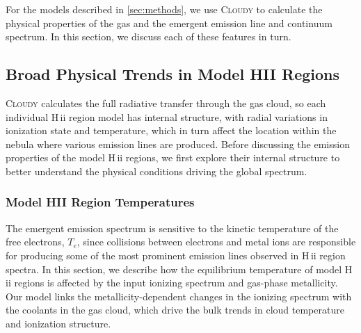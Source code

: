 \documentclass[twocolumn, tighten]{aastex61}
\newcommand{\Sec}[1]{\autoref{sec:#1}}
\newcommand{\Cloudy}{\textsc{Cloudy}\xspace}
\newcommand{\Te}{\ensuremath{T_{e}}}
\newcommand{\hii}{H\,{\sc ii}\xspace}
\begin{document}
For the models described in \Sec{methods}, we use \Cloudy to calculate the physical properties of the gas and the emergent emission line and continuum spectrum. In this section, we discuss each of these features in turn.

\subsection{Broad Physical Trends in Model HII Regions}\label{sec:models:broad}

\Cloudy calculates the full radiative transfer through the gas cloud, so each individual \hii region model has internal structure, with radial variations in ionization state and temperature, which in turn affect the location within the nebula where various emission lines are produced. Before discussing the emission properties of the model \hii regions, we first explore their internal structure to better understand the physical conditions driving the global spectrum.

\subsubsection{Model HII Region Temperatures}\label{sec:models:broad:temp}

The emergent emission spectrum is sensitive to the kinetic temperature of the free electrons, \Te{}, since collisions between electrons and metal ions are responsible for producing some of the most prominent emission lines observed in \hii region spectra. In this section, we describe how the equilibrium temperature of model \hii regions is affected by the input ionizing spectrum and gas-phase metallicity. Our model links the metallicity-dependent changes in the ionizing spectrum with the coolants in the gas cloud, which drive the bulk trends in cloud temperature and ionization structure.
\end{document}
